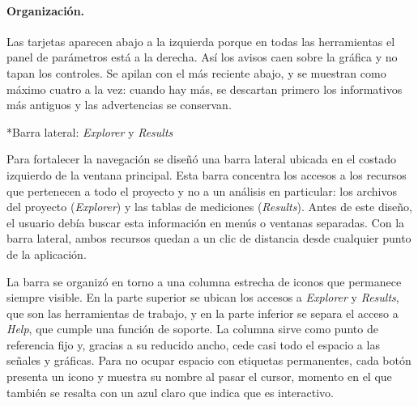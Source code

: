 \documentclass[12pt,letterpaper,oneside]{article}
\makeatletter
\newcommand{\subsubsubsection}[1]{%
  \@startsection{paragraph}{4}{\z@}{10pt plus 2pt minus 1pt}{4pt}%
    {\normalfont\normalsize\bfseries\itshape}*{#1}}
\makeatother
\begin{document}
\paragraph{Organización.} Las tarjetas aparecen abajo a la izquierda porque en todas las herramientas el panel de parámetros está a la derecha. Así los avisos caen sobre la gráfica y no tapan los controles. Se apilan con el más reciente abajo, y se muestran como máximo cuatro a la vez: cuando hay más, se descartan primero los informativos más antiguos y las advertencias se conservan.

\subsubsubsection{Barra lateral: \textit{Explorer} y \textit{Results}}

Para fortalecer la navegación se diseñó una barra lateral ubicada en el costado izquierdo de la ventana principal. Esta barra concentra los accesos a los recursos que pertenecen a todo el proyecto y no a un análisis en particular: los archivos del proyecto (\textit{Explorer}) y las tablas de mediciones (\textit{Results}). Antes de este diseño, el usuario debía buscar esta información en menús o ventanas separadas. Con la barra lateral, ambos recursos quedan a un clic de distancia desde cualquier punto de la aplicación.

La barra se organizó en torno a una columna estrecha de iconos que permanece siempre visible. En la parte superior se ubican los accesos a \textit{Explorer} y \textit{Results}, que son las herramientas de trabajo, y en la parte inferior se separa el acceso a \textit{Help}, que cumple una función de soporte. La columna sirve como punto de referencia fijo y, gracias a su reducido ancho, cede casi todo el espacio a las señales y gráficas. Para no ocupar espacio con etiquetas permanentes, cada botón presenta un icono y muestra su nombre al pasar el cursor, momento en el que también se resalta con un azul claro que indica que es interactivo.
\end{document}
